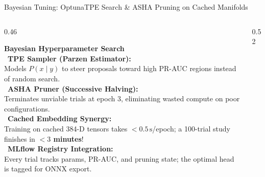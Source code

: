 \documentclass[aspectratio=169,10pt]{beamer}
\begin{document}
\begin{frame}{Bayesian Tuning: Optuna}{TPE Search \& ASHA Pruning on Cached Manifolds}
    \begin{columns}[T]
        \begin{column}{0.46\textwidth}
            \begin{tcolorbox}[enhanced, colback=SlateLight, colframe=BlueAccent!50, boxrule=0.6pt, arc=3pt, left=6pt, right=6pt, top=5pt, bottom=5pt]
                \raggedright\footnotesize
                \textbf{\color{BlueAccent} Bayesian Hyperparameter Search}\\[3pt]
                \textbullet\ \textbf{TPE Sampler (Parzen Estimator):}\\
                Models $P(x \mid y)$ to steer proposals toward high PR-AUC regions instead of random search.\\[3pt]
                \textbullet\ \textbf{ASHA Pruner (Successive Halving):}\\
                Terminates unviable trials at epoch 3, eliminating wasted compute on poor configurations.\\[3pt]
                \textbullet\ \textbf{Cached Embedding Synergy:}\\
                Training on cached 384-D tensors takes $<0.5\,\text{s}$/epoch; a 100-trial study finishes in \textbf{$<3$ minutes}!\\[3pt]
                \textbullet\ \textbf{MLflow Registry Integration:}\\
                Every trial tracks params, PR-AUC, and pruning state; the optimal head is tagged for ONNX export.
            \end{tcolorbox}
        \end{column}

        \begin{column}{0.52\textwidth}
            \centering
\end{column}
\end{columns}
\end{frame}
\end{document}
